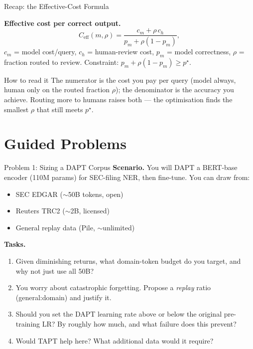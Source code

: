 \documentclass[9pt,t]{beamer}
\begin{document}
\begin{frame}{Recap: the Effective-Cost Formula}
\begin{underhood}
\textbf{Effective cost per correct output.}
\[
  C_{\text{eff}}(m,\rho) = \frac{c_m + \rho\,c_h}{p_m + \rho(1-p_m)},
\]
$c_m$ = model cost/query, $c_h$ = human-review cost, $p_m$ = model correctness,
$\rho$ = fraction routed to review. Constraint: $p_m + \rho(1-p_m) \ge p^\star$.
\end{underhood}

\medskip
\begin{block}{How to read it}
The numerator is the cost you pay per query (model always, human only on the routed
fraction $\rho$); the denominator is the accuracy you achieve. Routing more to humans
raises both --- the optimisation finds the smallest $\rho$ that still meets $p^\star$.
\end{block}
\end{frame}

\section{Guided Problems}

\begin{frame}{Problem 1: Sizing a DAPT Corpus}
\textbf{Scenario.} You will DAPT a BERT-base encoder (110M params) for SEC-filing NER,
then fine-tune. You can draw from:
\begin{itemize}
  \item SEC EDGAR ($\sim$50B tokens, open)
  \item Reuters TRC2 ($\sim$2B, licensed)
  \item General replay data (Pile, $\sim$unlimited)
\end{itemize}

\medskip
\textbf{Tasks.}
\begin{enumerate}
  \item[\textbf{A.}] Given diminishing returns, what domain-token budget do you target,
        and why not just use all 50B?
  \item[\textbf{B.}] You worry about catastrophic forgetting. Propose a \emph{replay}
        ratio (general:domain) and justify it.
  \item[\textbf{C.}] Should you set the DAPT learning rate above or below the original
        pre-training LR? By roughly how much, and what failure does this prevent?
  \item[\textbf{D.}] Would TAPT help here? What additional data would it require?
\end{enumerate}
\end{frame}
\end{document}
